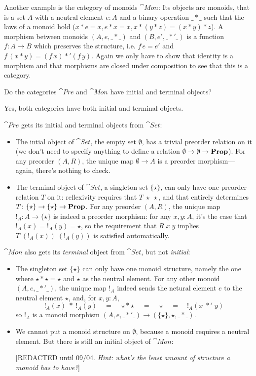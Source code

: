 Another example is the category of monoids $\cat{Mon}$: Its objects are monoids, that is a set $A$ with a neutral element $e:A$ and a binary operation $\_*\_$ such that the laws of a monoid hold ($x*e=x, e*x=x, x*(y*z) = (x*y)*z$). A morphism between monoids $(A,e, \_*\_)$ and $(B,e',\_*'\_)$ is a function $f : A \to B$ which preserves the structure, i.e. $f\,e = e'$ and $f\,(x * y) = (f\,x) *' (f\, y)$. Again we only have to show that identity is a morphism and that morphisms are closed under composition to see that this is a category.

\begin{Exercise}
  Do the categories $\cat{Pre}$ and $\cat{Mon}$ have initial and terminal objects?
\end{Exercise}
\begin{Answer}
  Yes, both categories have both initial and terminal objects. 
  
  $\cat{Pre}$ gets its initial and terminal objects from $\cat{Set}$:
  \begin{itemize}
    \item The intial object of $\cat{Set}$, the empty set $\emptyset$, has a trivial preorder relation on it (we don't need to specify anything to define a relation $\emptyset \to \emptyset \to \mathbf{Prop}$). For any preorder $(A,R)$, the unique map $\emptyset \to A$ is a preorder morphism---again, there's nothing to check.
    \item The terminal object of $\cat{Set}$, a singleton set $\{\star\}$, can only have one preorder relation $T$ on it: reflexivity requires that $T\;\star\;\star$, and that entirely determines $T\colon\{\star\}\to\{\star\}\to\mathbf{Prop}$. For any preorder $(A,R)$, the unique map $!_A\colon A\to\{\star\}$ is indeed a preorder morphism: for any $x,y\colon A$, it's the case that $!_A(x)=!_A(y)=\star$, so the requirement that $R\;x\;y$ implies $T\;(!_A(x))\;(!_A(y))$ is satisfied automatically.
  \end{itemize}

  $\cat{Mon}$ also gets its \emph{terminal} object from $\cat{Set}$, but not \emph{initial}:
  \begin{itemize}
    \item The singleton set $\{\star\}$ can only have one monoid structure, namely the one where $\star * \star = \star$ and $\star$ as the neutral element. For any other monoid $(A,e,\_*'\_)$, the unique map $!_A$ indeed sends the netural element $e$ to the neutral element $\star$, and, for $x,y\colon A$,
    \[ !_A(x)\;*\;!_A(y) \quad=\quad \star * \star \quad=\quad \star \quad=\quad !_A(x\;*'\;y) \]
    so $!_A$ is a monoid morphism $(A,e,\_*'\_) \to (\{\star\},\star,\_*\_)$.
    \item We cannot put a monoid structure on $\emptyset$, because a monoid requires a neutral element. But there is still an initial object of $\cat{Mon}$:
    
    [REDACTED until 09/04. \textit{Hint: what's the least amount of structure a monoid has to have?}]
  \end{itemize}
\end{Answer}

